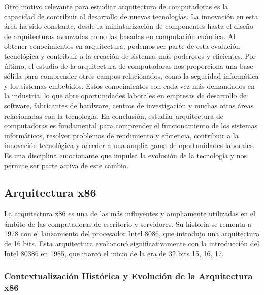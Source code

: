 \documentclass[12pt,twoside]{templates/unerthesis}
\begin{document}
Otro motivo relevante para estudiar arquitectura de computadoras es la capacidad de contribuir al desarrollo de nuevas tecnologías. La innovación en esta área ha sido constante, desde la miniaturización de componentes hasta el diseño de arquitecturas avanzadas como las basadas en computación cuántica. Al obtener conocimientos en arquitectura, podemos ser parte de esta evolución tecnológica y contribuir a la creación de sistemas más poderosos y eficientes.
Por último, el estudio de la arquitectura de computadoras nos proporciona una base sólida para comprender otros campos relacionados, como la seguridad informática y los sistemas embebidos. Estos conocimientos son cada vez más demandados en la industria, lo que abre oportunidades laborales en empresas de desarrollo de software, fabricantes de hardware, centros de investigación y muchas otras áreas relacionadas con la tecnología.
En conclusión, estudiar arquitectura de computadoras es fundamental para comprender el funcionamiento de los sistemas informáticos, resolver problemas de rendimiento y eficiencia, contribuir a la innovación tecnológica y acceder a una amplia gama de oportunidades laborales. Es una disciplina emocionante que impulsa la evolución de la tecnología y nos permite ser parte activa de este cambio.

\hypertarget{arquitectura-x86}{%
\subsection{Arquitectura x86}\label{arquitectura-x86}}

La arquitectura x86 es una de las más influyentes y ampliamente utilizadas en el ámbito de las computadoras de escritorio y servidores. Su historia se remonta a 1978 con el lanzamiento del procesador Intel 8086, que introdujo una arquitectura de 16 bits. Esta arquitectura evolucionó significativamente con la introducción del Intel 80386 en 1985, que marcó el inicio de la era de 32 bits \protect\hyperlink{ref-intel_64_2016}{15}, \protect\hyperlink{ref-amd_developer_2019}{16}, \protect\hyperlink{ref-abel_ibm_2000}{17}.

\hypertarget{contextualizaciuxf3n-histuxf3rica-y-evoluciuxf3n-de-la-arquitectura-x86}{%
\subsubsection{Contextualización Histórica y Evolución de la Arquitectura x86}\label{contextualizaciuxf3n-histuxf3rica-y-evoluciuxf3n-de-la-arquitectura-x86}}
\end{document}
